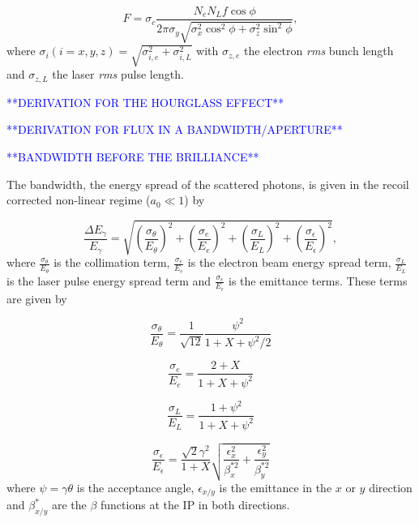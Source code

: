 \documentclass[../main.tex]{subfiles}
\begin{document}
\begin{equation}
F = \sigma_{c}\frac{N_{e}N_{L}f\cos\phi}{2\pi\sigma_{y}\sqrt{\sigma_{x}^{2}\cos^{2}\phi + \sigma_{z}^{2}\sin^{2}\phi}},
\label{eq:crossing_angle_flux}
\end{equation}
where $\sigma_{i}(i=x,y,z) = \sqrt{\sigma_{i,e}^{2}+\sigma_{i,L}^{2}}$ with $\sigma_{z,e}$ the electron \textit{rms} bunch length and $\sigma_{z,L}$ the laser \textit{rms} pulse length.

\textcolor{blue}{**DERIVATION FOR THE HOURGLASS EFFECT**}

\textcolor{blue}{**DERIVATION FOR FLUX IN A BANDWIDTH/APERTURE**}

\textcolor{blue}{**BANDWIDTH BEFORE THE BRILLIANCE**}

The bandwidth, the energy spread of the scattered photons, is given in the recoil corrected non-linear regime ($a_{0}\ll 1$) \cite{ranjan2018simulation} by

\begin{equation}
\frac{\Delta E_{\gamma}}{E_{\gamma}} = \sqrt{\left(\frac{\sigma_{\theta}}{E_{\theta}}\right)^{2}+\left(\frac{\sigma_{e}}{E_{e}}\right)^{2}+\left(\frac{\sigma_{L}}{E_{L}}\right)^{2}+\left(\frac{\sigma_{\epsilon}}{E_{\epsilon}}\right)^{2}},
\label{eq:bandwidth}    
\end{equation}
where $\frac{\sigma_{\theta}}{E_{\theta}}$ is the collimation term, $\frac{\sigma_{e}}{E_{e}}$ is the electron beam energy spread term, $\frac{\sigma_{L}}{E_{L}}$ is the laser pulse energy spread term and $\frac{\sigma_{\epsilon}}{E_{\epsilon}}$ is the emittance terms. These terms are given by

\begin{equation}
\frac{\sigma_{\theta}}{E_{\theta}} = \frac{1}{\sqrt{12}}\frac{\psi^{2}}{1+X+\psi^{2}/2}
\label{eq:collimation_term}
\end{equation}

\begin{equation}
\frac{\sigma_{e}}{E_{e}} = \frac{2+X}{1+X+\psi^{2}}
\label{eq:beam_energy_spread_term}
\end{equation}

\begin{equation}
\frac{\sigma_{L}}{E_{L}} = \frac{1+\psi^{2}}{1+X+\psi^{2}}
\label{eq:laser_energy_spread_term}
\end{equation}

\begin{equation}
\frac{\sigma_{\epsilon}}{E_{\epsilon}} = \frac{\sqrt{2}\gamma^{2}}{1+X}\sqrt{\frac{\epsilon_{x}^{2}}{\beta_{x}^{*2}}+\frac{\epsilon_{y}^{2}}{\beta_{y}^{*2}}}    
\end{equation}
where $\psi = \gamma\theta$ is the acceptance angle, $\epsilon_{x/y}$ is the emittance in the $x$ or $y$ direction and $\beta_{x/y}^{*}$ are the $\beta$ functions at the IP in both directions.
\end{document}
